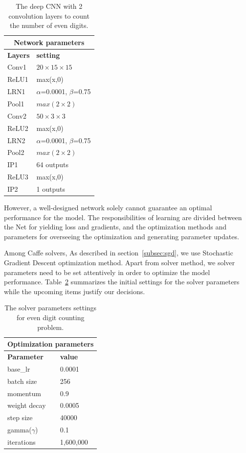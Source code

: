 \begin{table}[H]
	\centering
	\begin{tabular}{ |p{2cm}|p{2cm}| }
	\hline 
	\multicolumn{2}{|c|}{\textbf{Network parameters}} \\
	\hline
	\hline
	\textbf{Layers} & \textbf{setting }\\
	\hline
	Conv1 & $20\times15\times15$\\
	\hline
	ReLU1 & max(x,0)  \\
	\hline
	LRN1 & $\alpha$=0.0001, $\beta$=0.75\\
	\hline
	Pool1    & $max(2\times2)$ \\
	\hline
	Conv2 & $50\times3\times3$\\
	\hline
	ReLU2 & max(x,0)  \\
	\hline
	LRN2 & $\alpha$=0.0001, $\beta$=0.75\\
	\hline
	Pool2    & $max(2\times2)$ \\
	\hline
	IP1 & 64 outputs \\
	\hline
	ReLU3 & max(x,0)  \\
	\hline
	IP2 & 1 outputs \\
	\hline
	\end{tabular}
		\caption{The deep CNN with 2 convolution layers to count the number of even digits.}
		\label{fig:digitnet}
\end{table}




However, a well-designed network solely cannot guarantee an optimal performance for the model. The responsibilities of learning are divided between the Net for yielding loss and gradients, and the optimization methods and parameters for overseeing the optimization and generating parameter updates. 

Among Caffe solvers, As described in section~\ref{subsec:sgd}, we use Stochastic Gradient Descent optimization method. Apart from solver method, we solver parameters need to be set attentively in order to optimize the model performance. Table~\ref{tab:digitsolver} summarizes the initial settings for the solver parameters while the upcoming items justify our decisions.

\begin{table}[H]
	\centering
	\begin{tabular}{ |p{2cm}|p{2cm}| }
	\hline 
	\multicolumn{2}{|c|}{\textbf{Optimization parameters}} \\
	\hline
	\hline
	\textbf{Parameter} & \textbf{value}\\
	\hline
	base\_lr & 0.0001\\
	\hline
	batch size & 256\\
	\hline
	momentum & 0.9  \\
	\hline
	weight decay & 0.0005\\
	\hline
	step size   & 40000 \\
	\hline
	gamma($\gamma$) & 0.1\\
	\hline
	iterations & 1,600,000\\
	\hline
	\end{tabular}
		\caption{The solver parameters settings for even digit counting problem.}
		\label{tab:digitsolver}
\end{table}


